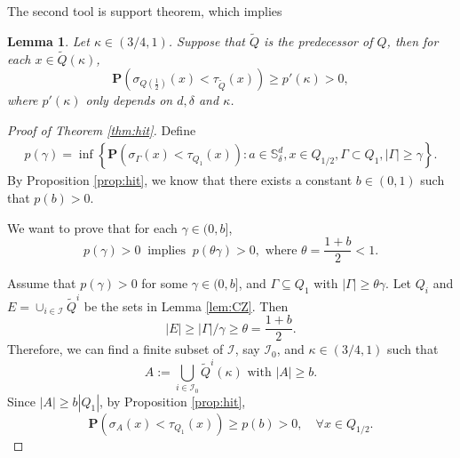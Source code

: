 \documentclass[twoside, 12pt]{book}
\numberwithin{equation}{chapter}
\newtheorem{lemma}[theorem]{Lemma}
\def\cI{{\mathcal I}}
\def\mS{{\mathbb S}}
\def\bP{{\mathbf P}}
\def\l{\left}
\def\r{\right}
\def\geq{\geqslant}
\begin{document}
	The second tool is support theorem, which implies 
	\begin{lemma}\label{lem:hitcube}
		Let $\kappa\in (3/4,1)$. Suppose that $\widetilde{Q}$ is the predecessor of $Q$, then for each $x\in \widetilde{Q}(\kappa)$,  
		\[
		 \bP\l( \sigma_{Q(\frac{1}{2})} (x) <\tau_{\widetilde{Q}}(x) \r)\geq p'(\kappa)>0,  
		\]
		where $p'(\kappa)$ only depends on $d, \delta$ and $\kappa$. 
	\end{lemma}
	
	\begin{proof}[Proof of Theorem \ref{thm:hit}] 
		Define 
		\begin{align*}
			p(\gamma)=\inf \l\{ \bP\l(\sigma_\Gamma(x)<\tau_{Q_{1}}(x)\r): a\in \mS^d_\delta, x\in Q_{1/2},  \Gamma\subset Q_1, |\Gamma|\geq \gamma \r\}. 
		\end{align*}
		By Proposition \ref{prop:hit}, we know that there exists a constant $b\in (0,1)$ such that $p(b)>0$. 
		\begin{framed}
			We want to prove that for each $\gamma\in (0,b]$, 
			\[
			    p(\gamma)>0 ~\mbox{ implies }~ p\l(\theta\gamma\r)>0, \mbox{ where } \theta=\frac{1+b}{2}<1. 
			\] 
		\end{framed}
		Assume that $p(\gamma)>0$ for some $\gamma\in (0,b]$, and $\Gamma \subseteq Q_1$ with $|\Gamma|\geq \theta \gamma$. Let $Q_i$ and $E=\cup_{i\in \cI} \widetilde{Q}^i$ be the sets in Lemma \ref{lem:CZ}. Then 
		\[
		    |E|\geq {|\Gamma|}/{\gamma} \geq \theta =\frac{1+b}{2}. 
		\]
		Therefore, we can find a finite subset of $\cI$, say $\cI_0$, and $\kappa\in (3/4,1)$ such that 
		\[
		   A :=\bigcup_{i\in \cI_0} \widetilde{Q}^i(\kappa)  \mbox{ with } |A|\geq b. 
		\]
		Since $|A|\geq b |Q_1|$, by Proposition \ref{prop:hit}, 
		\begin{equation}\label{eq:hit1}
			\bP\l(\sigma_A(x)<\tau_{Q_1}(x)\r)\geq p(b)>0, \quad \forall x\in Q_{1/2}. 
		\end{equation}
		

\end{proof}
\end{document}
